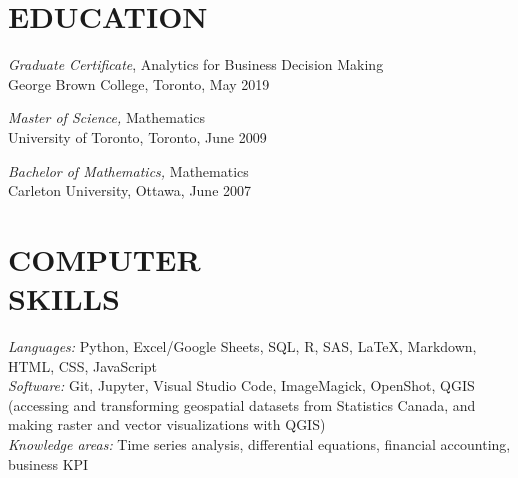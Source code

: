 \documentclass[margin, 10pt]{res} %
\begin{document}
\begin{resume}
\section{EDUCATION}

{\sl Graduate Certificate}, Analytics for Business Decision Making \\
George Brown College, Toronto, May 2019

{\sl Master of Science,} Mathematics \\
University of Toronto, Toronto, June 2009

{\sl Bachelor of Mathematics,} Mathematics \\
Carleton University, Ottawa, June 2007





\section{COMPUTER \\ SKILLS} 

{\sl Languages:} 
Python, Excel/Google Sheets, SQL, R, SAS, \LaTeX{}, Markdown, HTML, CSS, JavaScript \\

{\sl Software:}
Git, Jupyter, Visual Studio Code, ImageMagick, OpenShot, QGIS (accessing and transforming geospatial datasets from Statistics Canada, and making raster and vector visualizations with QGIS)\\

{\sl Knowledge areas:}
Time series analysis, differential equations, financial accounting, business KPI

\end{resume}
\end{document}
